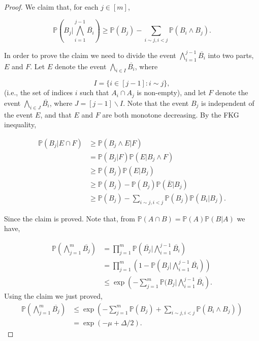 \documentclass[12pt,twoside,a4paper,bibliography=totocnumbered]{book}
\numberwithin{equation}{section}
\let\backslash=\smallsetminus
\theoremstyle{remark}
\begin{document}
\begin{proof}
We claim that, for each $j \in [m]$,

$$\mathbb{P} \left( B_j | \bigwedge_{i=1}^{j-1} \overline{B_i} \right) \geq \mathbb{P}(B_j) - \sum_{i\sim j, i<j} \mathbb{P}(B_i \wedge B_j). $$

In order to prove the claim we need to divide the event $\bigwedge^{j-1}_ {i=1} \overline{B_i}$ into two parts, $E$ and $F$. Let $E$ denote the event $\bigwedge_{i \in I} \overline{B_i}$, where

$$ I = \{ i \in [j-1]\colon i \sim j \},$$
(i.e., the set of indices $i$ such that $A_i \cap A_j$ is non-empty), and let $F$ denote the event $\bigwedge_{i \in J} \overline{B_i}$, where $J=[j-1]\backslash I$. Note that the event $B_j$ is independent of the event $E$, and that $E$ and $F$ are both monotone decreasing. By the FKG inequality,

\begin{align*}
\mathbb{P}(B_j | E \cap F) & \geq \mathbb{P}(B_j \wedge E | F)\\
& = \mathbb{P}(B_j | F) \mathbb{P}(E | B_j \wedge F)\\
& \geq \mathbb{P}(B_j)\mathbb{P}(E|B_j)\\
& \geq \mathbb{P}(B_j) - \mathbb{P}(B_j) \mathbb{P}(\overline{E} | B_j)\\
& \geq \mathbb{P}(B_j) - \sum_{i \sim j, i < j}\mathbb{P}(B_j) \mathbb{P}(B_i | B_j).
\end{align*}

Since the claim is proved. Note that, from $\mathbb{P}(A\cap B) = \mathbb{P}(A)\mathbb{P}(B|A)$ we have,

\begin{align*}
\mathbb{P}\left( \bigwedge_{j=1}^m \overline{B_j} \right) &= \prod_{j=1}^m \mathbb{P}\left( \overline{B_j} | \bigwedge_{i = 1}^{j-1} \overline{B_i}\right)\\
& = \prod_{j=1}^m \left( 1 - \mathbb{P}\left(B_j | \bigwedge_{i = 1}^{j-1} \overline{B_i}\right)\right)\\
& \leq \exp\left(- \sum_{j=1}^m \mathbb{P}(B_j | \bigwedge_{i=1}^{j-1} \overline{B_i}\right).
\end{align*}
Using the claim we just proved,
\begin{align*}
\mathbb{P}\left( \bigwedge_{j=1}^m \overline{B_j} \right) &\leq  \exp\left(- \sum_{j=1}^m \mathbb{P}(B_j) + \sum_{i \sim j, i< j} \mathbb{P}(B_i \wedge B_j)\right)\\
& = \exp( - \mu + \Delta /2).
\end{align*}


\end{proof}
\end{document}
